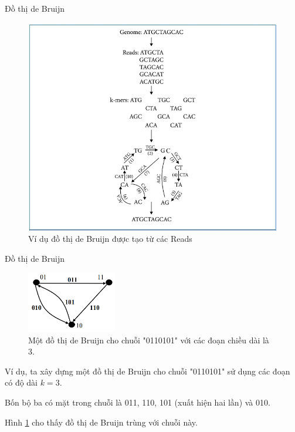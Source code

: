 \documentclass[10pt]{beamer}
\theoremstyle{remark}
\numberwithin{algocf}{section}
\numberwithin{equation}{section}
\numberwithin{dl}{section}
\numberwithin{figure}{section}
\begin{document}
\begin{frame}{Đồ thị de Bruijn}
    \begin{figure}[h!]
        \centering
        \includegraphics[height=0.75\textheight]{figures/de_Bruijn_graph_from_short_read_example.png}
        \caption{Ví dụ đồ thị de Bruijn được tạo từ các Reads}
    \end{figure}
\end{frame}

\begin{frame}{Đồ thị de Bruijn}
    \begin{figure}[h!]
        \centering
        \includegraphics[width=0.35\textwidth]{1.png}
        \caption{Một đồ thị de Bruijn cho chuỗi "0110101" với các đoạn chiều dài là 3.}
        \label{fig:1}
    \end{figure}

    Ví dụ, ta xây dựng một đồ thị de Bruijn cho chuỗi "0110101" sử dụng các đoạn có độ dài $k=3$.

    Bốn bộ ba có mặt trong chuỗi là 011, 110, 101 (xuất hiện hai lần) và 010.
    
    Hình \ref{fig:1} cho thấy đồ thị de Bruijn trùng với chuỗi này.
\end{frame}
\end{document}
